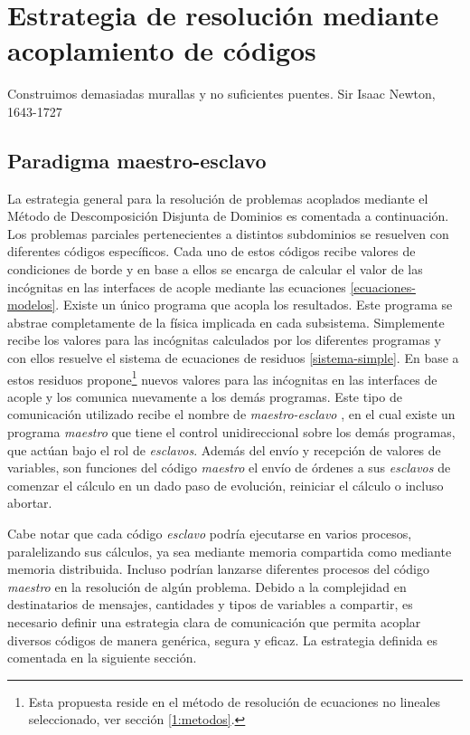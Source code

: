 \chapter{Estrategia de resolución mediante acoplamiento de códigos}
\label{chap2}
\chapterquote
{Construimos demasiadas murallas y no suficientes puentes.}
{Sir Isaac Newton, 1643-1727}

\section{Paradigma maestro-esclavo}
\label{2:maestro-esclavo}
La estrategia general para la resolución de problemas acoplados mediante el Método de Descomposición Disjunta de Dominios es comentada a continuación.
Los problemas parciales pertenecientes a distintos subdominios se resuelven con diferentes códigos específicos.
Cada uno de estos códigos recibe valores de condiciones de borde y en base a ellos se encarga de calcular el valor de las incógnitas en las interfaces de acople mediante las ecuaciones \ref{ecuaciones-modelos}.
Existe un único programa que acopla los resultados.
Este programa se abstrae completamente de la física implicada en cada subsistema.
Simplemente recibe los valores para las incógnitas calculados por los diferentes programas y con ellos resuelve el sistema de ecuaciones de residuos \ref{sistema-simple}.
En base a estos residuos propone\footnote{
Esta propuesta reside en el método de resolución de ecuaciones no lineales seleccionado, ver sección \ref{1:metodos}.
} nuevos valores para las inćognitas en las interfaces de acople y los comunica nuevamente a los demás programas.
Este tipo de comunicación utilizado recibe el nombre de \textit{maestro-esclavo} \cite{maestro-esclavo},
en el cual existe un programa \textit{maestro} que tiene el control unidireccional sobre los demás programas, que actúan bajo el rol de \textit{esclavos}.
Además del envío y recepción de valores de variables, son funciones del código \textit{maestro} el envío de órdenes a sus \textit{esclavos} de comenzar el cálculo en un dado paso de evolución, reiniciar el cálculo o incluso abortar.

Cabe notar que cada código \textit{esclavo} podría ejecutarse en varios procesos, paralelizando sus cálculos,
ya sea mediante memoria compartida como mediante memoria distribuida.
Incluso podrían lanzarse diferentes procesos del código \textit{maestro} en la resolución de algún problema.
Debido a la complejidad en destinatarios de mensajes, cantidades y tipos de variables a compartir,
es necesario definir una estrategia clara de comunicación
que permita acoplar diversos códigos de manera genérica, segura y eficaz.
La estrategia definida es comentada en la siguiente sección.

